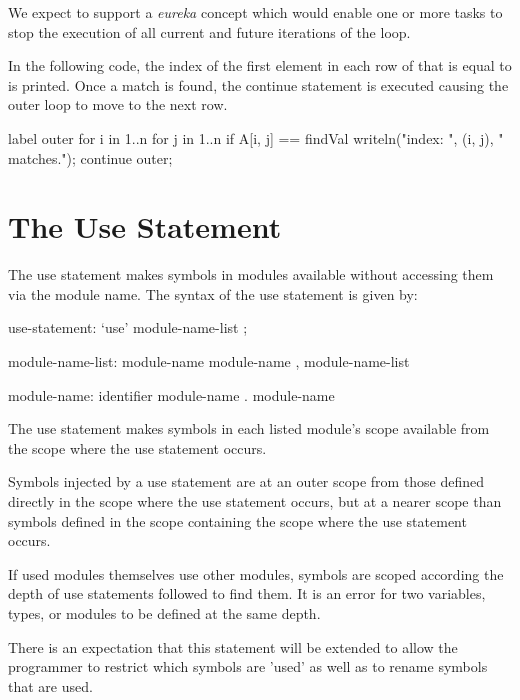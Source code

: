\begin{future}
We expect to support a \emph{eureka} concept which would enable one or
more tasks to stop the execution of all current and future iterations
of the loop.
\end{future}

\begin{example}
In the following code, the index of the first element in each row of
 that is equal to  is printed.  Once a match is
found, the continue statement is executed causing the outer loop to
move to the next row.
\begin{chapel}
label outer for i in 1..n {
  for j in 1..n {
    if A[i, j] == findVal {
      writeln("index: ", (i, j), " matches.");
      continue outer;
    }
  }
}
\end{chapel}
\end{example}

\section{The Use Statement}
\label{The_Use_Statement}

The use statement makes symbols in modules available without accessing
them via the module name.  The syntax of the use statement is given
by:
\begin{syntax}
use-statement:
  `use' module-name-list ;

module-name-list:
  module-name
  module-name , module-name-list

module-name:
  identifier
  module-name . module-name
\end{syntax}
The use statement makes symbols in each listed module's scope available
from the scope where the use statement occurs.

Symbols injected by a use statement are at an outer scope from those
defined directly in the scope where the use statement occurs, but at a
nearer scope than symbols defined in the scope containing the scope where
the use statement occurs.

If used modules themselves use other modules, symbols are scoped according
the depth of use statements followed to find them. It is an error for two
variables, types, or modules to be defined at the same depth.

\begin{openissue}
There is an expectation that this statement will be extended to allow
the programmer to restrict which symbols are 'used' as well as to
rename symbols that are used.
\end{openissue}


